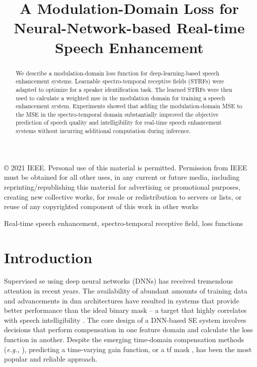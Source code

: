 \documentclass{article}
\title{A Modulation-Domain Loss for Neural-Network-based Real-time Speech Enhancement}
\newcommand{\eg}{\emph{e.g.,} }
\begin{document}
   © 2021 IEEE.  Personal use of this material is permitted.  Permission from IEEE must be obtained for all other uses, in any current or future media, including reprinting/republishing this material for advertising or promotional purposes, creating new collective works, for resale or redistribution to servers or lists, or reuse of any copyrighted component of this work in other works
 

\maketitle
\begin{abstract}
We describe a modulation-domain loss function for deep-learning-based speech enhancement systems. Learnable spectro-temporal receptive fields (STRFs) were adapted to optimize for a speaker identification task. The learned STRFs were then used to calculate a weighted \acrfull{mse} in the modulation domain for training a speech enhancement system. Experiments showed that adding the modulation-domain MSE to the MSE in the spectro-temporal domain substantially improved the objective prediction of speech quality and intelligibility for real-time speech enhancement systems without incurring additional computation during inference.
\end{abstract}
\begin{keywords}
Real-time speech enhancement, spectro-temporal receptive field, loss functions
\end{keywords}
\section{Introduction}
\label{sec:intro}
Supervised \gls{se} using deep neural networks (DNNs) has received tremendous attention in recent years. The availability of abundant amounts of training data and  advancements in \acrshort{dnn} architectures have resulted in systems that provide better performance than  the ideal binary mask \cite{luoConvTasNetSurpassingIdeal2019} -- a target that highly correlates with speech intelligibility \cite{loizouReasonsWhyCurrent2011,kryterValidationArticulationIndex1962}. The core design of a   DNN-based SE system involves  decisions that perform compensation in one feature domain and calculate the loss function in another. Despite the emerging time-domain compensation methods (\eg \cite{luoConvTasNetSurpassingIdeal2019}), predicting a time-varying gain function, or a \gls{tf} mask  \cite{wangTrainingTargetsSupervised2014}, has been the most popular and reliable approach.
\end{document}
